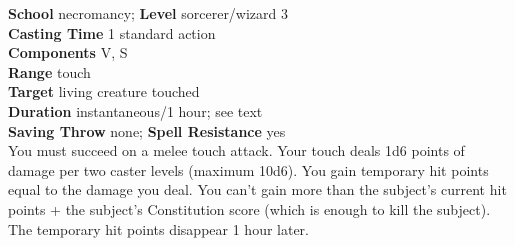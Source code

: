 \textbf{School} necromancy; \textbf{Level} sorcerer/wizard 3\\
\textbf{Casting Time} 1 standard action\\
\textbf{Components} V, S\\
\textbf{Range} touch\\
\textbf{Target} living creature touched\\
\textbf{Duration} instantaneous/1 hour; see text\\
\textbf{Saving Throw} none; \textbf{Spell Resistance} yes\\
You must succeed on a melee touch attack. Your touch deals 1d6 points of damage per two caster levels (maximum 10d6). You gain temporary hit points equal to the damage you deal. You can't gain more than the subject's current hit points + the subject's Constitution score (which is enough to kill the subject). The temporary hit points disappear 1 hour later.\\
